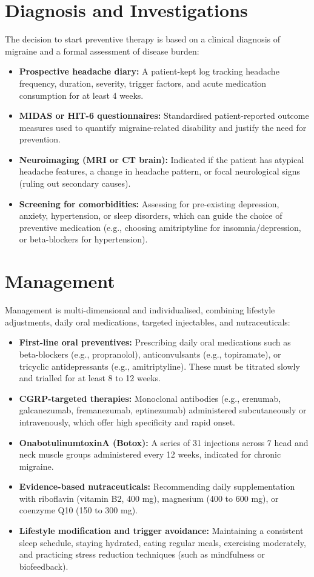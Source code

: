 \section*{Diagnosis and Investigations}
The decision to start preventive therapy is based on a clinical diagnosis of migraine and a formal assessment of disease burden:
\begin{itemize}
    \item \textbf{Prospective headache diary:} A patient-kept log tracking headache frequency, duration, severity, trigger factors, and acute medication consumption for at least 4 weeks.
    \item \textbf{MIDAS or HIT-6 questionnaires:} Standardised patient-reported outcome measures used to quantify migraine-related disability and justify the need for prevention.
    \item \textbf{Neuroimaging (MRI or CT brain):} Indicated if the patient has atypical headache features, a change in headache pattern, or focal neurological signs (ruling out secondary causes).
    \item \textbf{Screening for comorbidities:} Assessing for pre-existing depression, anxiety, hypertension, or sleep disorders, which can guide the choice of preventive medication (e.g., choosing amitriptyline for insomnia/depression, or beta-blockers for hypertension).
\end{itemize}

\section*{Management}
Management is multi-dimensional and individualised, combining lifestyle adjustments, daily oral medications, targeted injectables, and nutraceuticals:
\begin{itemize}
    \item \textbf{First-line oral preventives:} Prescribing daily oral medications such as beta-blockers (e.g., propranolol), anticonvulsants (e.g., topiramate), or tricyclic antidepressants (e.g., amitriptyline). These must be titrated slowly and trialled for at least 8 to 12 weeks.
    \item \textbf{CGRP-targeted therapies:} Monoclonal antibodies (e.g., erenumab, galcanezumab, fremanezumab, eptinezumab) administered subcutaneously or intravenously, which offer high specificity and rapid onset.
    \item \textbf{OnabotulinumtoxinA (Botox):} A series of 31 injections across 7 head and neck muscle groups administered every 12 weeks, indicated for chronic migraine.
    \item \textbf{Evidence-based nutraceuticals:} Recommending daily supplementation with riboflavin (vitamin B2, 400 mg), magnesium (400 to 600 mg), or coenzyme Q10 (150 to 300 mg).
    \item \textbf{Lifestyle modification and trigger avoidance:} Maintaining a consistent sleep schedule, staying hydrated, eating regular meals, exercising moderately, and practicing stress reduction techniques (such as mindfulness or biofeedback).
\end{itemize}

